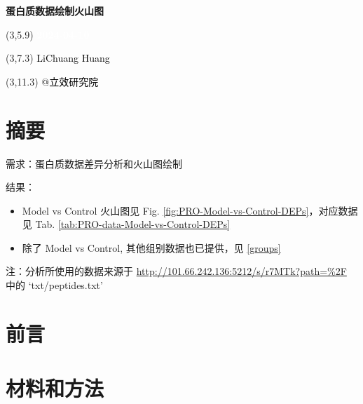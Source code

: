 \documentclass[
]{article}
\author{}
\date{\vspace{-2.5em}}
\providecommand{\tightlist}{%
  \setlength{\itemsep}{0pt}\setlength{\parskip}{0pt}}
\begin{document}
\begin{titlepage} 
\begin{center} \textbf{\Huge
蛋白质数据绘制火山图} \vspace{4em}
\begin{textblock}{10}(3,5.9) \huge
\textbf{\textcolor{white}{2024-04-10}}
\end{textblock} \begin{textblock}{10}(3,7.3)
\Large \textcolor{black}{LiChuang Huang}
\end{textblock} \begin{textblock}{10}(3,11.3)
\Large \textcolor{black}{@立效研究院}
\end{textblock} \end{center} \end{titlepage}
\restoregeometry


\tableofcontents

\listoffigures

\listoftables

\newpage


\hypertarget{abstract}{%
\section{摘要}\label{abstract}}

需求：蛋白质数据差异分析和火山图绘制

结果：

\begin{itemize}
\tightlist
\item
  Model vs Control 火山图见 Fig. \ref{fig:PRO-Model-vs-Control-DEPs}，对应数据见 Tab. \ref{tab:PRO-data-Model-vs-Control-DEPs}
\item
  除了 Model vs Control, 其他组别数据也已提供，见 \ref{groups}
\end{itemize}

注：分析所使用的数据来源于 \url{http://101.66.242.136:5212/s/r7MTk?path=\%2F} 中的 `txt/peptides.txt'

\hypertarget{introduction}{%
\section{前言}\label{introduction}}

\hypertarget{methods}{%
\section{材料和方法}\label{methods}}
\end{document}
